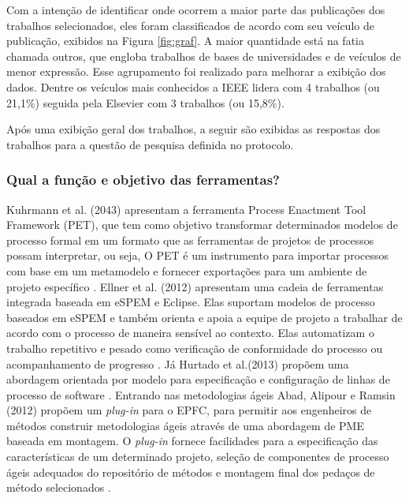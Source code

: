 Com a intenção de identificar onde ocorrem a maior parte das publicações dos trabalhos selecionados, eles foram classificados de acordo com seu veículo de publicação, exibidos na Figura \ref{fig:graf}. A maior quantidade está na fatia chamada outros, que engloba trabalhos de bases de universidades e de veículos de menor expressão. Esse agrupamento foi realizado para melhorar a exibição dos dados. Dentre os veículos mais conhecidos a IEEE lidera com 4 trabalhos (ou 21,1\%) seguida pela Elsevier com 3 trabalhos (ou 15,8\%).


Após uma exibição geral dos trabalhos, a seguir são exibidas as respostas dos trabalhos para a questão de pesquisa definida no protocolo.
\subsubsection{Qual a função e objetivo das ferramentas?}\label{subsub:trabalhosRelacionados_resultados_questao1}

 Kuhrmann et al. (2043) apresentam a ferramenta Process Enactment Tool Framework (PET), que tem como objetivo transformar determinados modelos de processo formal em um formato que as ferramentas de projetos de processos possam interpretar, ou seja,  O PET é um instrumento para importar processos com base em um metamodelo e fornecer exportações para um ambiente de projeto específico \cite{1kuhrmann:2014}. Ellner et al. (2012) apresentam uma cadeia de ferramentas integrada baseada em eSPEM e Eclipse. Elas suportam modelos de processo baseados em eSPEM e também orienta e apoia a equipe de projeto a trabalhar de acordo com o processo de maneira sensível ao contexto. Elas automatizam o trabalho repetitivo e pesado como verificação de conformidade do processo ou acompanhamento de progresso \cite{10ellner:2012}. Já Hurtado et al.(2013) propõem uma abordagem orientada por modelo para especificação e configuração de linhas de processo de software \cite{8hurtado:2013}. Entrando nas metodologias ágeis Abad, Alipour e Ramsin (2012)  propõem um \textit{plug-in} para o EPFC, para permitir aos engenheiros de métodos construir metodologias ágeis através de uma abordagem de PME baseada em montagem. O \textit{plug-in} fornece facilidades para a especificação das características de um determinado projeto, seleção de componentes de processo ágeis adequados do repositório de métodos e montagem final dos pedaços de método selecionados \cite{13abad:2012}.
 
